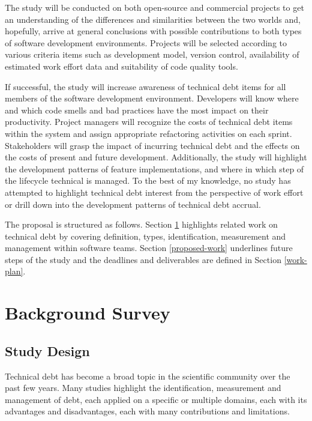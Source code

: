 \documentclass{mprop}
\begin{document}
The study will be conducted on both open-source and commercial projects to get
an understanding of the differences and similarities between the two worlds and,
hopefully, arrive at general conclusions with possible contributions to both
types of software development environments. Projects will be selected according
to various criteria items such as development model, version control,
availability of estimated work effort data and suitability of code quality
tools.

If successful, the study will increase awareness of technical debt items for all
members of the software development environment. Developers will know where and
which code smells and bad practices have the most impact on their productivity.
Project managers will recognize the costs of technical debt items within the
system and assign appropriate refactoring activities on each sprint.
Stakeholders will grasp the impact of incurring technical debt and the effects
on the costs of present and future development. Additionally, the study will
highlight the development patterns of feature implementations, and where in
which step of the lifecycle technical is managed. To the best of my knowledge,
no study has attempted to highlight technical debt interest from the perspective
of work effort or drill down into the development patterns of technical debt
accrual.

The proposal is structured as follows. Section \ref{lit-review} highlights
related work on technical debt by covering definition, types, identification,
measurement and management within software teams. Section \ref{proposed-work}
underlines future steps of the study and the deadlines and deliverables are
defined in Section \ref{work-plan}.

\section{Background Survey}
\label{lit-review}

\subsection{Study Design}

Technical debt has become a broad topic in the scientific community over the
past few years. Many studies highlight the identification, measurement and
management of debt, each applied on a specific or multiple domains, each with
its advantages and disadvantages, each with many contributions and limitations.
\end{document}
